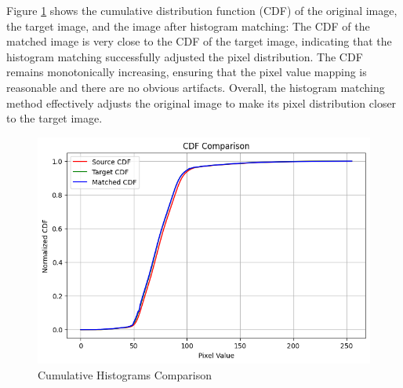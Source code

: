 \documentclass[12pt]{article}
\begin{document}
Figure \ref{fig:4.4-2} shows the cumulative distribution function (CDF) of the original image, the target image, and the image after histogram matching:
The CDF of the matched image is very close to the CDF of the target image, indicating that the histogram matching successfully adjusted the pixel distribution.
The CDF remains monotonically increasing, ensuring that the pixel value mapping is reasonable and there are no obvious artifacts.
Overall, the histogram matching method effectively adjusts the original image to make its pixel distribution closer to the target image.
\begin{figure}[ht]
        \centering
            \includegraphics[width=0.7\columnwidth, keepaspectratio]{pics/a2-4.4-2.png}
        \caption[]{Cumulative Histograms Comparison}
    \label{fig:4.4-2}
    \end{figure}
\end{document}
